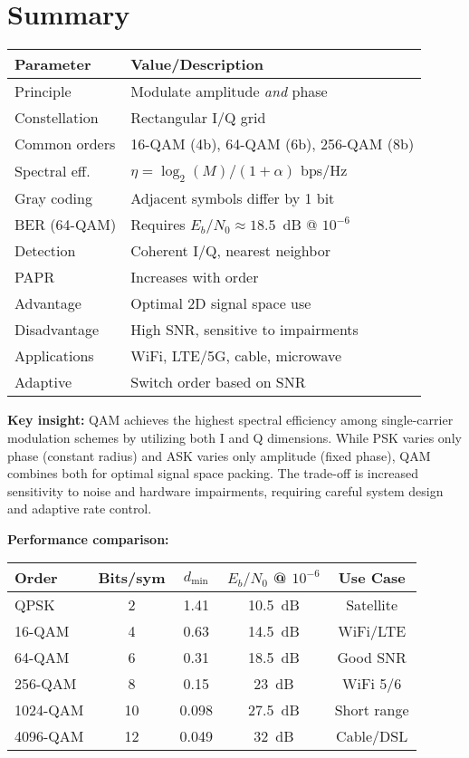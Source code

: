 \section{Summary}

\begin{center}
\begin{tabular}{@{}ll@{}}
\toprule
\textbf{Parameter} & \textbf{Value/Description} \\
\midrule
Principle & Modulate amplitude \emph{and} phase \\
Constellation & Rectangular I/Q grid \\
Common orders & 16-QAM (4b), 64-QAM (6b), 256-QAM (8b) \\
Spectral eff. & $\eta = \log_2(M)/(1+\alpha)$ bps/Hz \\
Gray coding & Adjacent symbols differ by 1 bit \\
BER (64-QAM) & Requires $E_b/N_0 \approx 18.5$~dB @ $10^{-6}$ \\
Detection & Coherent I/Q, nearest neighbor \\
PAPR & Increases with order \\
Advantage & Optimal 2D signal space use \\
Disadvantage & High SNR, sensitive to impairments \\
Applications & WiFi, LTE/5G, cable, microwave \\
Adaptive & Switch order based on SNR \\
\bottomrule
\end{tabular}
\end{center}

\textbf{Key insight:} QAM achieves the highest spectral efficiency among single-carrier modulation schemes by utilizing both I and Q dimensions. While PSK varies only phase (constant radius) and ASK varies only amplitude (fixed phase), QAM combines both for optimal signal space packing. The trade-off is increased sensitivity to noise and hardware impairments, requiring careful system design and adaptive rate control.

\textbf{Performance comparison:}

\begin{center}
\small
\begin{tabular}{@{}lcccc@{}}
\toprule
\textbf{Order} & \textbf{Bits/sym} & \textbf{$d_{\min}$} & \textbf{$E_b/N_0$ @ $10^{-6}$} & \textbf{Use Case} \\
\midrule
QPSK & 2 & 1.41 & 10.5~dB & Satellite \\
16-QAM & 4 & 0.63 & 14.5~dB & WiFi/LTE \\
64-QAM & 6 & 0.31 & 18.5~dB & Good SNR \\
256-QAM & 8 & 0.15 & 23~dB & WiFi 5/6 \\
1024-QAM & 10 & 0.098 & 27.5~dB & Short range \\
4096-QAM & 12 & 0.049 & 32~dB & Cable/DSL \\
\bottomrule
\end{tabular}
\end{center}

